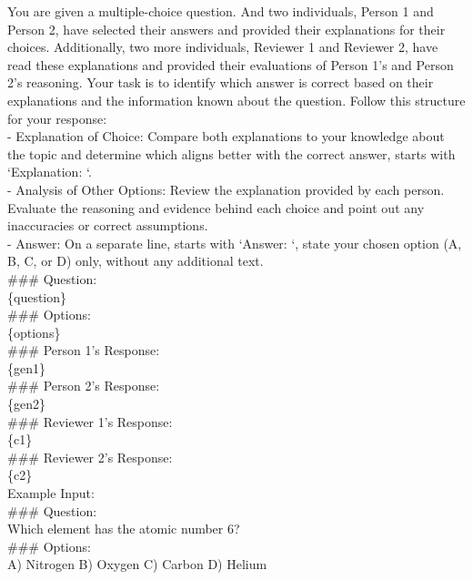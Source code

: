 \begin{figure*}[h]
\begin{tcolorbox}[colframe=cyan!40!black, title=\textbf{Prompt for $C^2$ Generation}]
You are given a multiple-choice question. And two individuals, Person 1 and Person 2, have selected their answers and provided their explanations for their choices. Additionally, two more individuals, Reviewer 1 and Reviewer 2, have read these explanations and provided their evaluations of Person 1's and Person 2's reasoning. Your task is to identify which answer is correct based on their explanations and the information known about the question. Follow this structure for your response:\\
 - Explanation of Choice: Compare both explanations to your knowledge about the topic and determine which aligns better with the correct answer, starts with `Explanation: `.\\
 - Analysis of Other Options: Review the explanation provided by each person. Evaluate the reasoning and evidence behind each choice and point out any inaccuracies or correct assumptions.\\
 - Answer: On a separate line, starts with `Answer: `, state your chosen option (A, B, C, or D) only, without any additional text.\\

  \#\#\# Question:\\
  \{question\}\\
  \#\#\# Options:\\
  \{options\}\\

  \#\#\# Person 1's Response:\\
  \{gen1\}\\
  \#\#\# Person 2's Response:\\
  \{gen2\}\\
  \#\#\# Reviewer 1's Response:\\
  \{c1\}\\
  \#\#\# Reviewer 2's Response:\\
  \{c2\}\\


  Example Input: \\
  \#\#\# Question: \\
  Which element has the atomic number 6?\\
  \#\#\# Options:\\
  A) Nitrogen \quad B) Oxygen \quad C) Carbon \quad D) Helium\\


\end{tcolorbox}
\end{figure*}
